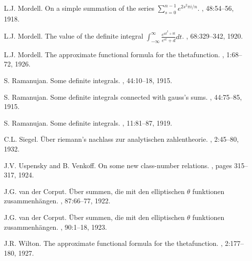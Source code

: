 \documentclass[12pt]{article}
\theoremstyle{remark}
\begin{document}
\begin{thebibliography}{99}
L.J. Mordell.
\newblock On a simple summation of the series $\sum_{s=0}^{n-1} e^{2s^2\pi i/n}$.
, 48:54--56, 1918.

L.J. Mordell.
\newblock The value of the definite integral $\int_{-\infty}^\infty \frac{e^{at^2+bt}}{e^{ct}+d} dt$.
, 68:329--342, 1920.

L.J. Mordell.
\newblock The approximate functional formula for the thetafunction.
, 1:68--72, 1926.

S. Ramanujan.
\newblock Some definite integrals.
, 44:10--18, 1915.

S. Ramanujan.
\newblock Some definite integrals connected with gauss's sums.
, 44:75--85, 1915.

S. Ramanujan.
\newblock Some definite integrals.
, 11:81--87, 1919.

C.L. Siegel.
\newblock \"Uber riemann's nachlass zur analytischen zahlentheorie.
, 2:45--80, 1932.

J.V. Uspensky and B. Venkoff.
\newblock On some new class-number relations.
, pages 315--317, 1924.

J.G. van der Corput.
\newblock \"Uber summen, die mit den elliptischen $\theta$ funktionen zusammenh\"angen.
, 87:66--77, 1922.

J.G. van der Corput.
\newblock \"Uber summen, die mit den elliptischen $\theta$ funktionen zusammenh\"angen.
, 90:1--18, 1923.

J.R. Wilton.
\newblock The approximate functional formula for the thetafunction.
, 2:177--180, 1927.

\end{thebibliography}
\end{document}
